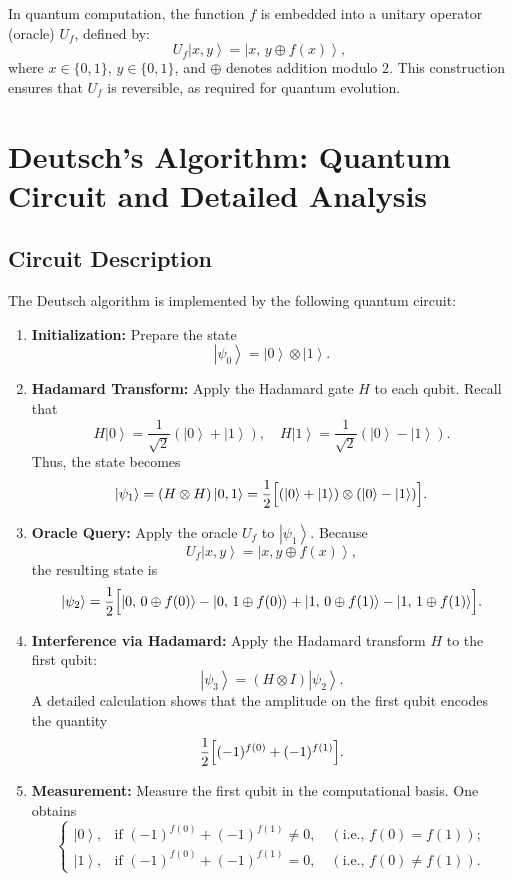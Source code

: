 \documentclass[11pt,oneside]{book}
\theoremstyle{remark}
\renewcommand{\ket}[1]{\left|#1\right\rangle}
\begin{document}
	In quantum computation, the function $f$ is embedded into a unitary operator (oracle) $U_f$, defined by:
	\[
	U_f\ket{x,y}=\ket{x,\,y\oplus f(x)},
	\]
	where $x\in\{0,1\}$, $y\in\{0,1\}$, and $\oplus$ denotes addition modulo $2$. This construction ensures that $U_f$ is reversible, as required for quantum evolution.
	
	\chapter{Deutsch's Algorithm: Quantum Circuit and Detailed Analysis}
	
	\section{Circuit Description}
	
	The Deutsch algorithm is implemented by the following quantum circuit:
	\begin{enumerate}[label=\textbf{Step \arabic*:}, leftmargin=*, align=left]
		\item \textbf{Initialization:} Prepare the state
		\[
		\ket{\psi_0}=\ket{0}\otimes\ket{1}.
		\]
		\item \textbf{Hadamard Transform:} Apply the Hadamard gate $H$ to each qubit. Recall that
		\[
		H\ket{0}=\frac{1}{\sqrt{2}}(\ket{0}+\ket{1}),\quad H\ket{1}=\frac{1}{\sqrt{2}}(\ket{0}-\ket{1}).
		\]
		Thus, the state becomes
		\[
		\ket{\psi_1}=(H\otimes H)\ket{0,1}=\frac{1}{2}\Bigl[(\ket{0}+\ket{1})\otimes(\ket{0}-\ket{1})\Bigr].
		\]
		\item \textbf{Oracle Query:} Apply the oracle $U_f$ to $\ket{\psi_1}$. Because
		\[
		U_f\ket{x,y}=\ket{x,y\oplus f(x)},
		\]
		the resulting state is
		\[
		\ket{\psi_2}=\frac{1}{2}\Bigl[\ket{0,\,0\oplus f(0)}-\ket{0,\,1\oplus f(0)}+\ket{1,\,0\oplus f(1)}-\ket{1,\,1\oplus f(1)}\Bigr].
		\]
		\item \textbf{Interference via Hadamard:} Apply the Hadamard transform $H$ to the first qubit:
		\[
		\ket{\psi_3}=(H\otimes I)\ket{\psi_2}.
		\]
		A detailed calculation shows that the amplitude on the first qubit encodes the quantity
		\[
		\frac{1}{2}\Bigl[(-1)^{f(0)}+(-1)^{f(1)}\Bigr].
		\]
		\item \textbf{Measurement:} Measure the first qubit in the computational basis. One obtains
		\[
		\begin{cases}
			\ket{0}, & \text{if } (-1)^{f(0)}+(-1)^{f(1)}\neq 0, \quad (\text{i.e., } f(0)=f(1));\\[1mm]
			\ket{1}, & \text{if } (-1)^{f(0)}+(-1)^{f(1)}=0, \quad (\text{i.e., } f(0)\neq f(1)).
		\end{cases}
		\]
	\end{enumerate}
	
\end{document}
